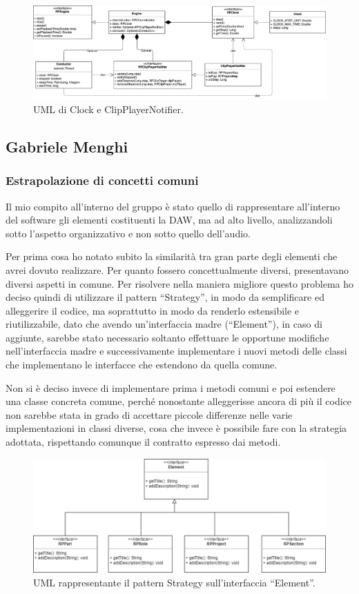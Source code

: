 \documentclass[a4paper,12pt]{report}
\begin{document}
\begin{figure}[H]
\centering{}
\includegraphics[width=\textwidth]{img/clock.png}
\caption{UML di Clock e ClipPlayerNotifier.}
\end{figure}

\subsection{Gabriele Menghi}
\subsubsection{Estrapolazione di concetti comuni}
Il mio compito all’interno del gruppo è stato quello di rappresentare all’interno del software gli elementi costituenti la DAW, ma ad alto livello, analizzandoli sotto l’aspetto organizzativo e non sotto quello dell’audio.

Per prima cosa ho notato subito la similarità tra gran parte degli elementi che avrei dovuto realizzare. Per quanto fossero concettualmente diversi, presentavano diversi aspetti in comune. Per risolvere nella maniera migliore questo problema ho deciso quindi di utilizzare il pattern “Strategy”, in modo da semplificare ed alleggerire il codice, ma soprattutto in modo da renderlo estensibile e riutilizzabile, dato che avendo un’interfaccia madre (“Element”), in caso di aggiunte, sarebbe stato necessario soltanto effettuare le opportune modifiche nell’interfaccia madre e successivamente implementare i nuovi metodi delle classi che implementano le interfacce che estendono da quella comune.

Non si è deciso invece di implementare prima i metodi  comuni e poi estendere una classe concreta comune, perché nonostante alleggerisse ancora di più il codice non sarebbe stata in grado di accettare piccole differenze nelle varie implementazioni in classi diverse, cosa che invece è possibile fare con la strategia adottata, rispettando comunque il contratto espresso dai metodi. 

\begin{figure}[h]
\centering{}
\includegraphics[width=\textwidth,scale=1]{img/element.png}
\caption{UML rappresentante il pattern Strategy sull’interfaccia “Element”.}
\end{figure}
\end{document}
